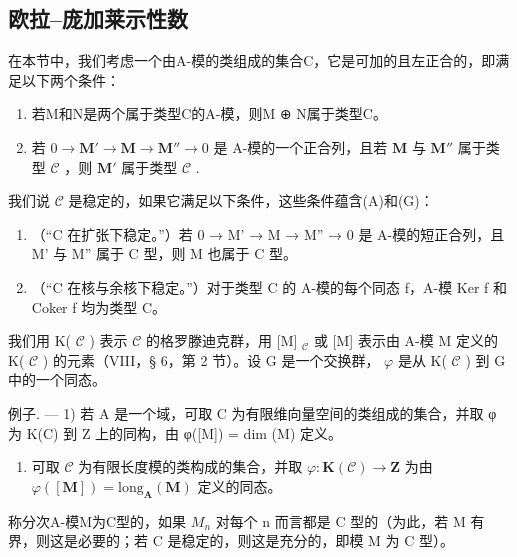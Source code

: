 \subsection{欧拉–庞加莱示性数}

在本节中，我们考虑一个由A-模的类组成的集合C，它是可加的且左正合的，即满足以下两个条件：

\begin{enumerate}
\def\labelenumi{(\Alph{enumi})}
\item
  若M和N是两个属于类型C的A-模，则M ⊕ N属于类型C。
\item
  若 \(0 \to \mathbf{M}' \to \mathbf{M} \to \mathbf{M}'' \to 0\) 是 A-模的一个正合列，且若 \(\mathbf{M}\) 与 \(\mathbf{M}''\) 属于类型 \(\mathcal{C}\) ，则 \(\mathbf{M}'\) 属于类型 \(\mathcal{C}\) .
\end{enumerate}

我们说 \(\mathcal{C}\) 是稳定的，如果它满足以下条件，这些条件蕴含(A)和(G)：

\begin{enumerate}
\def\labelenumi{(\Alph{enumi})}
\setcounter{enumi}{4}
\item
  （“C 在扩张下稳定。”）若 0 → M' → M → M'' → 0 是 A-模的短正合列，且 M' 与 M'' 属于 C 型，则 M 也属于 C 型。
\item
  （“C 在核与余核下稳定。”）对于类型 C 的 A-模的每个同态 f，A-模 Ker f 和 Coker f 均为类型 C。
\end{enumerate}

我们用 K( \(\mathcal{C}\) ) 表示 \(\mathcal{C}\) 的格罗滕迪克群，用 {[}M{]} \(_{\mathcal{C}}\) 或 {[}M{]} 表示由 A-模 M 定义的 K( \(\mathcal{C}\) ) 的元素（VIII，§ 6，第 2 节）。设 G 是一个交换群， \(\varphi\) 是从 K( \(\mathcal{C}\) ) 到 G 中的一个同态。

例子. --- 1) 若 A 是一个域，可取 C 为有限维向量空间的类组成的集合，并取 φ 为 K(C) 到 Z 上的同构，由 φ({[}M{]}) = dim (M) 定义。

\begin{enumerate}
\def\labelenumi{\arabic{enumi})}
\setcounter{enumi}{1}
\tightlist
\item
  可取 \(\mathcal{C}\) 为有限长度模的类构成的集合，并取 \(\varphi: \mathbf{K}(\mathcal{C}) \to \mathbf{Z}\) 为由 \(\varphi([\mathbf{M}]) = \text{long}_{\mathbf{A}}(\mathbf{M})\) 定义的同态。
\end{enumerate}

称分次A-模M为C型的，如果 \(M_{n}\) 对每个 n 而言都是 C 型的（为此，若 M 有界，则这是必要的；若 C 是稳定的，则这是充分的，即模 M 为 C 型）。

